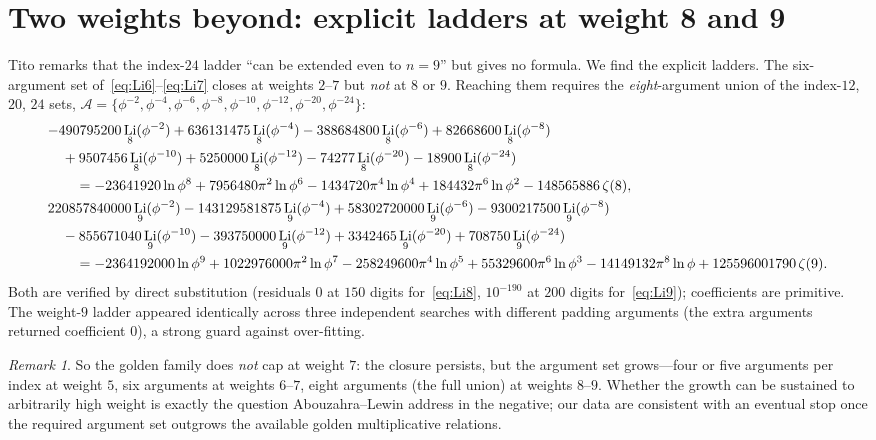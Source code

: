 \documentclass[11pt]{article}
\DeclareMathOperator{\Li}{Li}
\newcommand{\lp}{\ln\phi}
\theoremstyle{plain}\newtheorem{theorem}{Theorem}\newtheorem{proposition}[theorem]{Proposition}
\theoremstyle{remark}\newtheorem{remark}[theorem]{Remark}
\begin{document}
\section{Two weights beyond: explicit ladders at weight 8 and 9}
Tito remarks that the index-$24$ ladder ``can be extended even to $n=9$'' but gives no formula. We find the
explicit ladders. The six-argument set of~\eqref{eq:Li6}--\eqref{eq:Li7} closes at weights $2$--$7$ but
\emph{not} at $8$ or $9$. Reaching them requires the \emph{eight}-argument union of the index-$12$, $20$, $24$
sets, $\mathcal A=\{\phi^{-2},\phi^{-4},\phi^{-6},\phi^{-8},\phi^{-10},\phi^{-12},\phi^{-20},\phi^{-24}\}$:
{\scriptsize
\begin{align}
\label{eq:Li8}
  &{-}490795200\Li_8(\phi^{-2})+636131475\Li_8(\phi^{-4})-388684800\Li_8(\phi^{-6})+82668600\Li_8(\phi^{-8})\notag\\
  &\quad+9507456\Li_8(\phi^{-10})+5250000\Li_8(\phi^{-12})-74277\Li_8(\phi^{-20})-18900\Li_8(\phi^{-24})\notag\\
  &\qquad=-23641920\lp^8+7956480\pi^2\lp^6-1434720\pi^4\lp^4+184432\pi^6\lp^2-148565886\,\zeta(8),\\
\label{eq:Li9}
  &220857840000\Li_9(\phi^{-2})-143129581875\Li_9(\phi^{-4})+58302720000\Li_9(\phi^{-6})-9300217500\Li_9(\phi^{-8})\notag\\
  &\quad-855671040\Li_9(\phi^{-10})-393750000\Li_9(\phi^{-12})+3342465\Li_9(\phi^{-20})+708750\Li_9(\phi^{-24})\notag\\
  &\qquad=-2364192000\lp^9+1022976000\pi^2\lp^7-258249600\pi^4\lp^5+55329600\pi^6\lp^3-14149132\pi^8\lp+125596001790\,\zeta(9).
\end{align}}
Both are verified by direct substitution (residuals $0$ at $150$ digits for~\eqref{eq:Li8}, $10^{-190}$ at $200$
digits for~\eqref{eq:Li9}); coefficients are primitive. The weight-$9$ ladder appeared identically across three
independent searches with different padding arguments (the extra arguments returned coefficient $0$), a strong
guard against over-fitting.
\begin{remark}
So the golden family does \emph{not} cap at weight $7$: the closure persists, but the argument set grows---four
or five arguments per index at weight $5$, six arguments at weights $6$--$7$, eight arguments (the full union) at
weights $8$--$9$. Whether the growth can be sustained to arbitrarily high weight is exactly the question
Abouzahra--Lewin address in the negative; our data are consistent with an eventual stop once the required
argument set outgrows the available golden multiplicative relations.
\end{remark}
\end{document}
